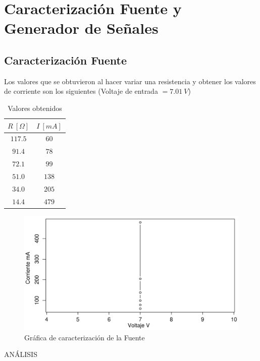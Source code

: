 \documentclass[twocolumn]{IEEEtran}
\begin{document}
\section{Caracterización Fuente y Generador de Señales}
\subsection{Caracterización Fuente}
\noindent
Los valores que se obtuvieron al hacer variar una resistencia y obtener los valores de corriente son los siguientes (Voltaje de entrada $= 7.01\ V$)
\begin{table}[H]
	\centering
\begin{tabular}[c]{|c|c|} \hline
$R \ [\Omega]$ & $I\ [mA]$ \\ \hline
$117.5$ & $60$ \\ \hline
$91.4$ & $78$ \\ \hline
$72.1$ & $99$ \\ \hline
$51.0$ & $138$ \\ \hline
$34.0$ & $205$ \\ \hline
$14.4$ & $479$ \\ \hline
\end{tabular}
	\caption{Valores obtenidos}
	\label{tab9}
\end{table}
\begin{figure}[H]
	\centering
		\includegraphics[scale=0.2]{reg1.png}
	\caption{Gráfica de caracterización de la Fuente}
	\label{fig20}
\end{figure}
\noindent
ANÁLISIS
\end{document}
